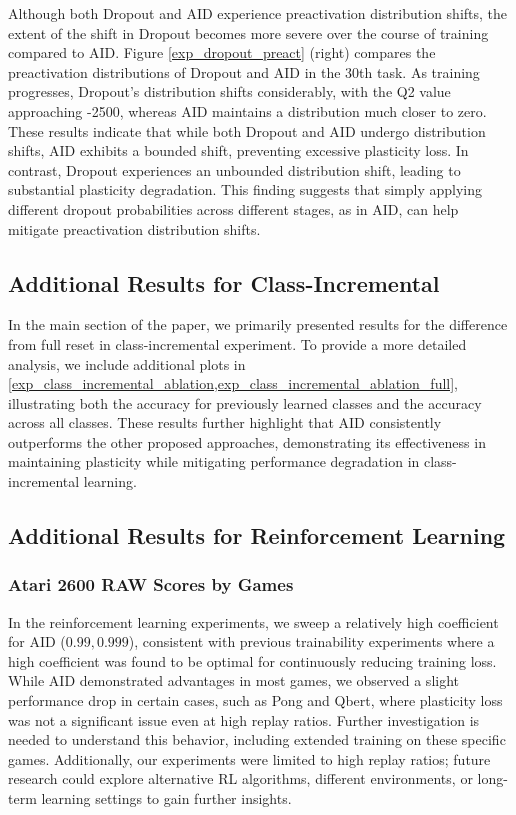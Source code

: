 Although both Dropout and AID experience preactivation distribution shifts, the extent of the shift in Dropout becomes more severe over the course of training compared to AID. Figure \ref{exp_dropout_preact} (right) compares the preactivation distributions of Dropout and AID in the 30th task. As training progresses, Dropout's distribution shifts considerably, with the Q2 value approaching -2500, whereas AID maintains a distribution much closer to zero. These results indicate that while both Dropout and AID undergo distribution shifts, AID exhibits a bounded shift, preventing excessive plasticity loss. In contrast, Dropout experiences an unbounded distribution shift, leading to substantial plasticity degradation. This finding suggests that simply applying different dropout probabilities across different stages, as in AID, can help mitigate preactivation distribution shifts.





\newpage
\subsection{Additional Results for Class-Incremental}
\label{app:omitted_results_CI}



In the main section of the paper, we primarily presented results for the difference from full reset in class-incremental experiment. To provide a more detailed analysis, we include additional plots in \cref{exp_class_incremental_ablation,exp_class_incremental_ablation_full}, illustrating both the accuracy for previously learned classes and the accuracy across all classes. These results further highlight that AID consistently outperforms the other proposed approaches, demonstrating its effectiveness in maintaining plasticity while mitigating performance degradation in class-incremental learning.

\newpage
\subsection{Additional Results for Reinforcement Learning}
\label{app:omitted_results_rl}
\subsubsection{Atari 2600 RAW Scores by Games}


In the reinforcement learning experiments, we sweep a relatively high coefficient for AID ($0.99, 0.999$), consistent with previous trainability experiments where a high coefficient was found to be optimal for continuously reducing training loss. While AID demonstrated advantages in most games, we observed a slight performance drop in certain cases, such as Pong and Qbert, where plasticity loss was not a significant issue even at high replay ratios. Further investigation is needed to understand this behavior, including extended training on these specific games. Additionally, our experiments were limited to high replay ratios; future research could explore alternative RL algorithms, different environments, or long-term learning settings to gain further insights.

